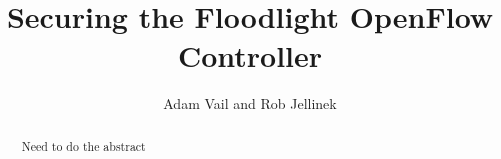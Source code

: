\documentclass[11pt,pdftex,twocolumn]{article}
\title{Securing the Floodlight OpenFlow Controller}
\author{Adam Vail and Rob Jellinek}
\begin{document}
\maketitle

\begin{abstract}
Need to do the abstract
\end{abstract}




%
%

% 

{\footnotesize 
}
\end{document}
